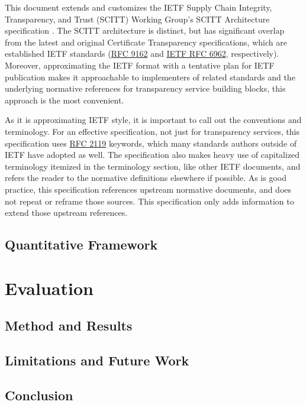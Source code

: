 \documentclass{jdf}
\begin{document}
This document extends and customizes the IETF Supply Chain Integrity, Transparency, and Trust (SCITT) Working Group's SCITT Architecture specification \citeyear{scitt25}. The SCITT architecture is distinct, but has significant overlap from the latest and original Certificate Transparency specifications, which are established IETF standards (\href{https://datatracker.ietf.org/doc/html/rfc9162}{RFC 9162} and \href{https://datatracker.ietf.org/doc/html/rfc6962}{IETF RFC 6962}, respectively). Moreover, approximating the IETF format with a tentative plan for IETF publication makes it approachable to implementers of related standards and the underlying normative references for transparency service building blocks, this approach is the most convenient.

As it is approximating IETF style, it is important to call out the conventions and terminology. For an effective specification, not just for transparency services, this specification uses \href{https://datatracker.ietf.org/doc/html/rfc2119}{RFC 2119} keywords, which many standards authors outside of IETF have adopted as well. The specification also makes heavy use of capitalized terminology itemized in the terminology section, like other IETF documents, and refers the reader to the normative definitions elsewhere if possible. As is good practice, this specification references upstream normative documents, and does not repeat or reframe those sources. This specification only adds information to extend those upstream references.

\subsection{Quantitative Framework}

\section{Evaluation}

\subsection{Method and Results}

\subsection{Limitations and Future Work}

\subsection{Conclusion}
\end{document}

